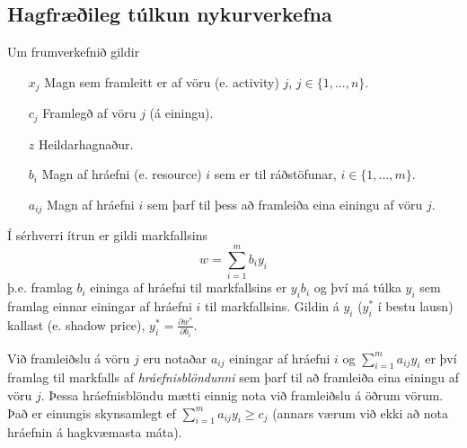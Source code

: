 \begin{samepage}
\section{Hagfræðileg túlkun nykurverkefna}
Um frumverkefnið gildir
\begin{itemize}
 \item[$x_j$] Magn sem framleitt er af vöru (e. activity) $j$, $j\in\{1,...,n\}$.
 \item[$c_j$] Framlegð af vöru $j$ (á einingu).
 \item[$z$] Heildarhagnaður.
 \item[$b_i$] Magn af hráefni (e. resource) $i$ sem er til ráðstöfunar, $i\in\{1,...,m\}$.
 \item[$a_{ij}$] Magn af hráefni $i$ sem þarf til þess að framleiða eina einingu af vöru $j$.
\end{itemize}
Í sérhverri ítrun er gildi markfallsins
$$w=\sum_{i=1}^m b_iy_i$$
þ.e. framlag $b_i$ eininga af hráefni til markfallsins er $y_ib_i$ og því má túlka $y_i$ sem framlag einnar einingar af hráefni $i$ til markfallsins. Gildin á $y_i$ ($y_i^*$ í bestu lausn) kallast  (e. shadow price), $y_i^*=\frac{\partial w^*}{\partial b_i}$.

Við framleiðslu á vöru $j$ eru notaðar $a_{ij}$ einingar af hráefni $i$ og $\sum_{i=1}^m a_{ij}y_i$ er því framlag til markfalls af \emph{hráefnisblöndunni} sem þarf til að framleiða eina einingu af vöru $j$. Þessa hráefnisblöndu mætti einnig nota við framleiðslu á öðrum vörum. Það er einungis skynsamlegt ef $\sum_{i=1}^m a_{ij}y_i\geq c_j$ (annars værum við ekki að nota hráefnin á hagkvæmasta máta).
\end{samepage}
